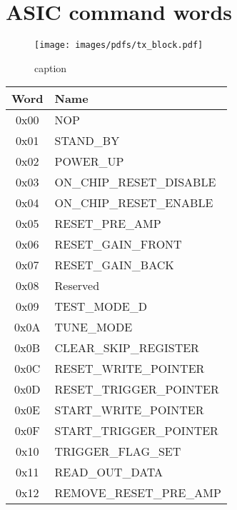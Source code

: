 \documentclass[]{article}
\begin{document}
    \appendix
    \section{ASIC command words} %
    \label{sec:asic_command_words}
    
    \begin{figure}[htbp]
        \centering
            \texttt{[image: images/pdfs/tx\_block.pdf]}
        \caption{caption}
        \label{fig:images_pdfs_tx_block}
    \end{figure}
    
    \begin{table}
        \begin{center}
            \setlength{\extrarowheight}{1.5pt}
            \begin{tabular}{c | l}
                Word & Name \\
                \hline  
                0x00 & NOP \\
                0x01 & STAND\_BY \\
                0x02 & POWER\_UP \\
                0x03 & ON\_CHIP\_RESET\_DISABLE \\
                0x04 & ON\_CHIP\_RESET\_ENABLE \\
                0x05 & RESET\_PRE\_AMP \\
                0x06 & RESET\_GAIN\_FRONT \\
                0x07 & RESET\_GAIN\_BACK \\
                0x08 & Reserved \\
                0x09 & TEST\_MODE\_D \\
                0x0A & TUNE\_MODE \\
                0x0B & CLEAR\_SKIP\_REGISTER \\
                0x0C & RESET\_WRITE\_POINTER \\
                0x0D & RESET\_TRIGGER\_POINTER \\
                0x0E & START\_WRITE\_POINTER \\
                0x0F & START\_TRIGGER\_POINTER \\
                0x10 & TRIGGER\_FLAG\_SET \\
                0x11 & READ\_OUT\_DATA \\
                0x12 & REMOVE\_RESET\_PRE\_AMP \\

\end{tabular}
\end{center}
\end{table}
\end{document}
